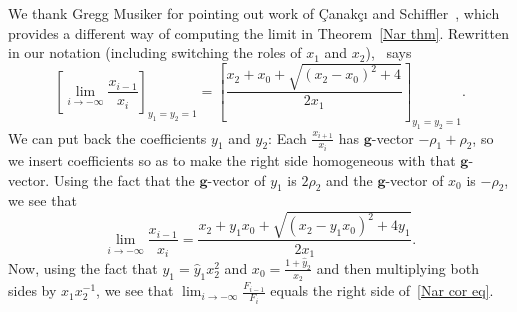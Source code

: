 \documentclass[ALCO,ThmDefs,Unicode,epreuves]{cedram}
\newcommand{\N}{{\mathcal N}}
\newcommand{\g}{\mathbf{g}}
\newcommand{\hy}{\hat{y}}
\begin{document}
\begin{rema}\label{Ralf and Ilke}
We thank Gregg Musiker for pointing out work of \c{C}anak\c{c}{\i} and Schiffler~\cite{CaSch}, which provides a different way of computing the limit in Theorem~\ref{Nar thm}.
Rewritten in our notation (including switching the roles of $x_1$ and $x_2$),~\cite[Corollary~7.6(b)]{CaSch} says 
\begin{equation}
\left[\lim_{i\to-\infty}\frac{x_{i-1}}{x_i}\right]_{y_1=y_2=1}=\left[\frac{x_2+x_0+\sqrt{(x_2-x_0)^2+4}}{2x_1}\right]_{y_1=y_2=1}.\end{equation}
We can put back the coefficients $y_1$ and $y_2$:
Each $\frac{x_{i+1}}{x_i}$ has $\g$-vector $-\rho_1+\rho_2$, so we insert coefficients so as to make the right side homogeneous with that $\g$-vector.
Using the fact that the $\g$-vector of $y_1$ is $2\rho_2$ %
and the $\g$-vector of $x_0$ is $-\rho_2$, we see that 
\begin{equation}\lim_{i\to-\infty}\frac{x_{i-1}}{x_i}=\frac{x_2+y_1x_0+\sqrt{(x_2-y_1x_0)^2+4y_1}}{2x_1}.\end{equation}
Now, using the fact that $y_1=\hy_1x_2^2$ and $x_0=\frac{1+\hy_2}{x_2}$ and then multiplying both sides by $x_1x_2^{-1}$, 
we see that $\lim_{i\to-\infty}\frac{F_{i-1}}{F_i}$ equals the right side of~\eqref{Nar cor eq}.
\end{rema}
\end{document}
